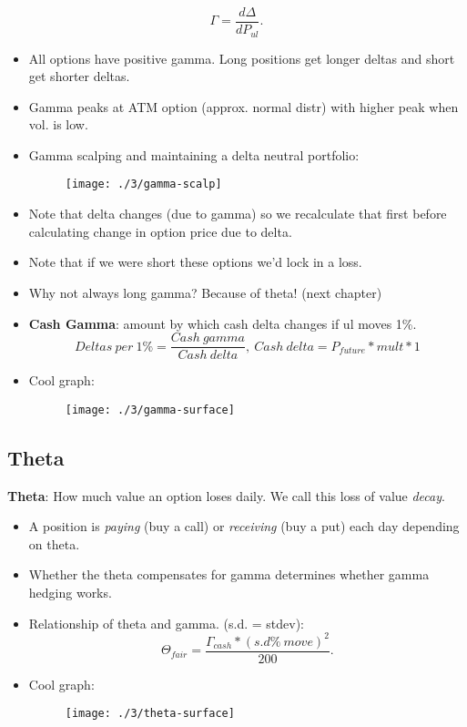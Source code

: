 \documentclass{article}
\begin{document}
\begin{equation}
    \Gamma = \frac{d\Delta}{dP_{ul}}.
\end{equation}

\begin{itemize}
    \item All options have positive gamma. Long positions get longer deltas and
    short get shorter deltas.
    \item Gamma peaks at ATM option (approx. normal distr) with higher peak when
    vol. is low.
    \item Gamma scalping and maintaining a delta neutral portfolio:
    \begin{figure}[h]
        \texttt{[image: ./3/gamma-scalp]}
        \centering
    \end{figure}
    \item Note that delta changes (due to gamma) so we recalculate that first
    before calculating change in option price due to delta.
    \item Note that if we were short these options we'd lock in a loss.
    \item Why not always long gamma? Because of theta! (next chapter)
    \item \textbf{Cash Gamma}: amount by which cash delta changes if ul moves 1\%.
    \begin{equation*}
        Deltas \ per \ 1\% = \frac{Cash \ gamma}{Cash \ delta}, \ Cash \ delta = P_{future}*mult*1
    \end{equation*}
    \newpage
    \item Cool graph:

    \begin{figure}[h]
        \texttt{[image: ./3/gamma-surface]}
        \centering
    \end{figure}
\end{itemize}

\subsection{Theta}
\textbf{Theta}: How much value an option loses daily. We call this loss of value
\textit{decay}.

\begin{itemize}
    \item A position is \textit{paying} (buy a call) or \textit{receiving} (buy
    a put) each day
    depending on theta.
    \item Whether the theta compensates for gamma determines whether gamma
    hedging works.
    \item Relationship of theta and gamma. (s.d. = stdev):
    \begin{equation*}
        \Theta_{fair} = \frac{\Gamma_{cash}*(s.d \% \ move)^2}{200}.
    \end{equation*}
    \newpage
    \item Cool graph:
    \begin{figure}[h]
        \texttt{[image: ./3/theta-surface]}
        \centering
    \end{figure}
\end{itemize}
\end{document}
